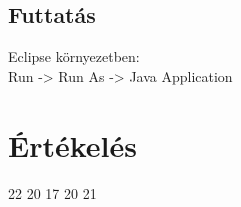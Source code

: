 \subsection{Futtatás}
Eclipse környezetben:\\
Run -> Run As -> Java Application

\section{Értékelés}

\begin{ertekeles}
{22}        %
{20}
{17}
{20}
{21}
\end{ertekeles}


